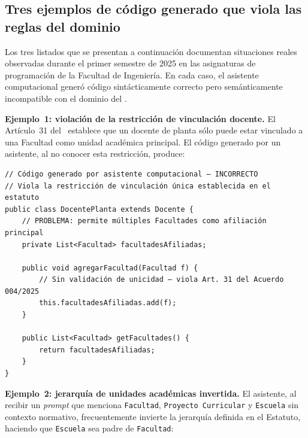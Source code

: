 \subsection{Tres ejemplos de código generado que viola las reglas del dominio}
\label{subsec:ejemplos-violacion}

Los tres listados que se presentan a continuación documentan situaciones reales
observadas durante el primer semestre de 2025 en las asignaturas de programación
de la Facultad de Ingeniería. En cada caso, el asistente computacional generó
código sintácticamente correcto pero semánticamente incompatible con el dominio
del \acuerdo.

\textbf{Ejemplo~1: violación de la restricción de vinculación docente.}
El Artículo~31 del \acuerdo\ establece que un docente de planta sólo puede
estar vinculado a una Facultad como unidad académica principal. El código
generado por un asistente, al no conocer esta restricción, produce:

\begin{lstlisting}[style=javaStyle,
  caption={Código generado que viola la restricción de vinculación única del
    docente (Artículo~31 del Acuerdo 004 de 2025). El error es semántico,
    no sintáctico: el compilador no lo detecta.},
  label={lst:violacion-vinculacion}]
// Código generado por asistente computacional — INCORRECTO
// Viola la restricción de vinculación única establecida en el estatuto
public class DocentePlanta extends Docente {
    // PROBLEMA: permite múltiples Facultades como afiliación principal
    private List<Facultad> facultadesAfiliadas;

    public void agregarFacultad(Facultad f) {
        // Sin validación de unicidad — viola Art. 31 del Acuerdo 004/2025
        this.facultadesAfiliadas.add(f);
    }

    public List<Facultad> getFacultades() {
        return facultadesAfiliadas;
    }
}
\end{lstlisting}

\textbf{Ejemplo~2: jerarquía de unidades académicas invertida.}
El asistente, al recibir un \textit{prompt} que menciona \texttt{Facultad},
\texttt{Proyecto Curricular} y \texttt{Escuela} sin contexto normativo,
frecuentemente invierte la jerarquía definida en el Estatuto, haciendo que
\texttt{Escuela} sea padre de \texttt{Facultad}:


